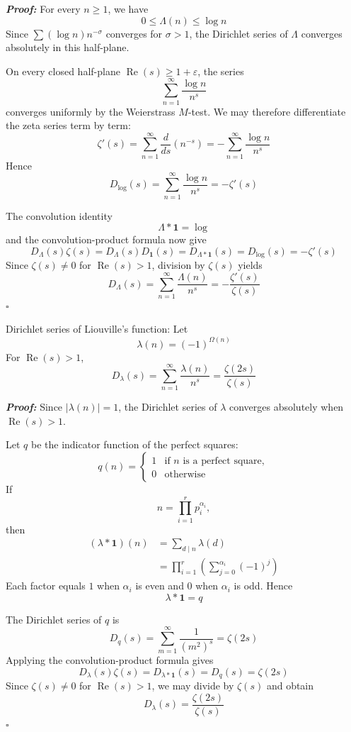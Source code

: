 \documentclass[a4paper,11pt,abstracton]{scrartcl}
\theoremstyle{dotlessP}
\theoremstyle{dotlessS}
\theoremstyle{remark}
\theoremstyle{definition}
\begin{document}
\begin{claim_box}
\textbf{\textit{Proof:}}
For every $n\geq1$, we have
\[
    0\leq\Lambda(n)\leq\log n
\]
Since $\sum (\log n)n^{-\sigma}$ converges for $\sigma>1$, the
Dirichlet series of $\Lambda$ converges absolutely in this half-plane.

On every closed half-plane
$\operatorname{Re}(s)\geq1+\varepsilon$, the series
\[
    \sum_{n=1}^{\infty}\frac{\log n}{n^s}
\]
converges uniformly by the Weierstrass $M$-test. We may therefore
differentiate the zeta series term by term:
\[
    \zeta'(s)
      =\sum_{n=1}^{\infty}\frac{d}{ds}(n^{-s})
      =-\sum_{n=1}^{\infty}\frac{\log n}{n^s}
\]
Hence
\[
    D_{\log}(s)
      =\sum_{n=1}^{\infty}\frac{\log n}{n^s}
      =-\zeta'(s)
\]

The convolution identity
\[
    \Lambda*\mathbf{1}=\log
\]
and the convolution-product formula now give
\[
    D_\Lambda(s)\zeta(s)
      =D_\Lambda(s)D_{\mathbf{1}}(s)
      =D_{\Lambda*\mathbf{1}}(s)
      =D_{\log}(s)
      =-\zeta'(s)
\]
Since $\zeta(s)\neq0$ for $\operatorname{Re}(s)>1$, division by
$\zeta(s)$ yields
\[
    D_\Lambda(s)
      =\sum_{n=1}^{\infty}\frac{\Lambda(n)}{n^s}
      =-\frac{\zeta'(s)}{\zeta(s)}
\]
\hfill$\square$
\end{claim_box}

\begin{mainbox}{Dirichlet series of Liouville's function:}
Let
\[
    \lambda(n)=(-1)^{\Omega(n)}
\]
For $\operatorname{Re}(s)>1$,
\[
    D_\lambda(s)
      =\sum_{n=1}^{\infty}\frac{\lambda(n)}{n^s}
      =\frac{\zeta(2s)}{\zeta(s)}
\]
\end{mainbox}

\begin{claim_box}
\textbf{\textit{Proof:}}
Since $|\lambda(n)|=1$, the Dirichlet series of $\lambda$ converges
absolutely when $\operatorname{Re}(s)>1$.

Let $q$ be the indicator function of the perfect squares:
\[
    q(n)=
      \begin{cases}
          1 & \text{if $n$ is a perfect square},\\
          0 & \text{otherwise}
      \end{cases}
\]
If
\[
    n=\prod_{i=1}^{r}p_i^{\alpha_i},
\]
then
\begin{align*}
    (\lambda*\mathbf{1})(n)
      &=\sum_{d\mid n}\lambda(d)\\
      &=\prod_{i=1}^{r}
        \left(\sum_{j=0}^{\alpha_i}(-1)^j\right)
\end{align*}
Each factor equals $1$ when $\alpha_i$ is even and $0$ when
$\alpha_i$ is odd. Hence
\[
    \lambda*\mathbf{1}=q
\]

The Dirichlet series of $q$ is
\[
    D_q(s)
      =\sum_{m=1}^{\infty}\frac1{(m^2)^s}
      =\zeta(2s)
\]
Applying the convolution-product formula gives
\[
    D_\lambda(s)\zeta(s)
      =D_{\lambda*\mathbf{1}}(s)
      =D_q(s)=\zeta(2s)
\]
Since $\zeta(s)\neq0$ for $\operatorname{Re}(s)>1$, we may divide by
$\zeta(s)$ and obtain
\[
    D_\lambda(s)=\frac{\zeta(2s)}{\zeta(s)}
\]
\hfill$\square$
\end{claim_box}
\end{document}
